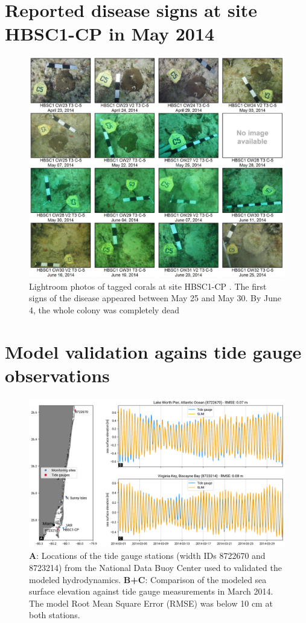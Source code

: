 \documentclass[preprint,12pt,authoryear]{elsarticle}
\begin{document}
\section{Reported disease signs at site HBSC1-CP in May 2014}\label{onset:appendice}
\begin{figure}[h!]
	\centering
	\includegraphics[width=\textwidth]{figures/hbsc1_cp.png}
	\caption{Lightroom photos of tagged corals at site HBSC1-CP \citep{dial2017}. The first signs of the disease appeared between May 25 and May 30. By June 4, the whole colony was completely dead}
\end{figure}
\newpage
\section{Model validation agains tide gauge observations}\label{onset:validation}
\begin{figure}[h!]
    \centering
	\includegraphics[width=\textwidth]{figures/fig_validation_new.png}
    \caption{\textbf{A}: Locations of the tide gauge stations (width IDs 8722670 and 8723214) from the National Data Buoy Center used to validated the modeled hydrodynamics. \textbf{B+C}: Comparison of the modeled sea surface elevation against tide gauge measurements in March 2014. The model Root Mean Square Error (RMSE) was below 10 cm at both stations.
}\end{figure}
\end{document}
